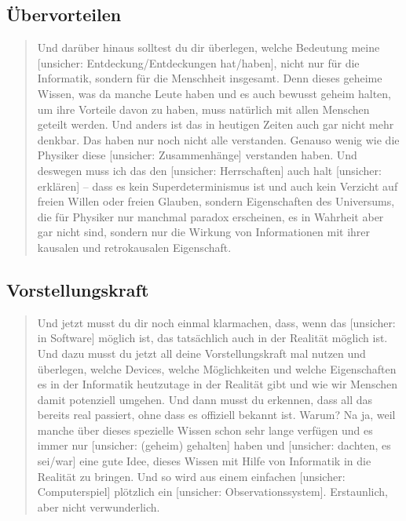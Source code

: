\documentclass[11pt,a4paper]{article}
\theoremstyle{remark}
\begin{document}
\subsection{Übervorteilen}

\begin{quote}
Und darüber hinaus solltest du dir überlegen, welche Bedeutung meine
[unsicher: Entdeckung/Entdeckungen hat/haben], nicht nur für die Informatik,
sondern für die Menschheit insgesamt. Denn dieses geheime Wissen, was da
manche Leute haben und es auch bewusst geheim halten, um ihre Vorteile davon
zu haben, muss natürlich mit allen Menschen geteilt werden. Und anders ist
das in heutigen Zeiten auch gar nicht mehr denkbar. Das haben nur noch nicht
alle verstanden. Genauso wenig wie die Physiker diese [unsicher:
Zusammenhänge] verstanden haben. Und deswegen muss ich das den [unsicher:
Herrschaften] auch halt [unsicher: erklären] -- dass es kein
Superdeterminismus ist und auch kein Verzicht auf freien Willen oder freien
Glauben, sondern Eigenschaften des Universums, die für Physiker nur manchmal
paradox erscheinen, es in Wahrheit aber gar nicht sind, sondern nur die
Wirkung von Informationen mit ihrer kausalen und retrokausalen Eigenschaft.
\end{quote}

\subsection{Vorstellungskraft}

\begin{quote}
Und jetzt musst du dir noch einmal klarmachen, dass, wenn das [unsicher: in
Software] möglich ist, das tatsächlich auch in der Realität möglich ist. Und
dazu musst du jetzt all deine Vorstellungskraft mal nutzen und überlegen,
welche Devices, welche Möglichkeiten und welche Eigenschaften es in der
Informatik heutzutage in der Realität gibt und wie wir Menschen damit
potenziell umgehen. Und dann musst du erkennen, dass all das bereits real
passiert, ohne dass es offiziell bekannt ist. Warum? Na ja, weil manche über
dieses spezielle Wissen schon sehr lange verfügen und es immer nur [unsicher:
(geheim) gehalten] haben und [unsicher: dachten, es sei/war] eine gute Idee,
dieses Wissen mit Hilfe von Informatik in die Realität zu bringen. Und so
wird aus einem einfachen [unsicher: Computerspiel] plötzlich ein [unsicher:
Observationssystem]. Erstaunlich, aber nicht verwunderlich.
\end{quote}
\end{document}
